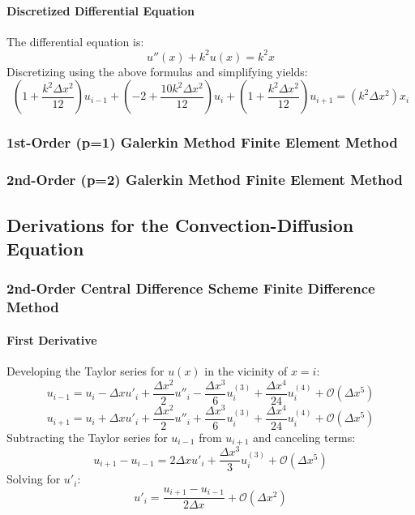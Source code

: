 \documentclass[10pt]{article}		%
\numberwithin{equation}{section}
\begin{document}
\paragraph{Discretized Differential Equation}

The differential equation is:
\begin{equation}
u''(x)+k^2u(x)=k^2x
\end{equation}
Discretizing using the above formulas and simplifying yields:
\begin{equation}
\left(1 + \frac{k^2\Delta x^2}{12}\right) u_{i-1} + \left(-2 + \frac{10 k^2\Delta x^2}{12}\right) u_{i} + \left(1+ \frac{k^2\Delta x^2}{12}\right) u_{i+1} = \left(k^2\Delta x^2 \right)x_i
\end{equation}

\subsubsection{ 1st-Order (p=1) Galerkin Method Finite Element Method}

\subsubsection{ 2nd-Order (p=2) Galerkin Method Finite Element Method}

\newpage

\subsection{Derivations for the Convection-Diffusion Equation}

\subsubsection{2nd-Order Central Difference Scheme Finite Difference Method}

\paragraph{First Derivative}
Developing the Taylor series for $u(x)$ in the vicinity of $x = i$:
\begin{equation}
u_{i-1} = u_i - \Delta x u'_i + \frac{\Delta x^2}{2} u''_i - \frac{\Delta x^3}{6} u^{(3)}_i + \frac{\Delta x^4}{24} u^{(4)}_i + \mathcal{O}(\Delta x^5)
\end{equation}
\begin{equation}
u_{i+1} = u_i + \Delta x u'_i + \frac{\Delta x^2}{2} u''_i + \frac{\Delta x^3}{6} u^{(3)}_i + \frac{\Delta x^4}{24} u^{(4)}_i + \mathcal{O}(\Delta x^5)
\end{equation}
Subtracting the Taylor series for $u_{i-1}$ from $u_{i+1}$ and canceling terms:
\begin{equation}
u_{i+1} - u_{i-1} = 2\Delta xu'_i + \frac{\Delta x^3}{3} u^{(3)}_i + \mathcal{O}(\Delta x^5)
\end{equation}
Solving for $u'_i$:
\begin{equation}
u'_i = \frac{u_{i+1} - u_{i-1}}{2 \Delta x} + \mathcal{O}(\Delta x^2) 
\end{equation}
\end{document}
